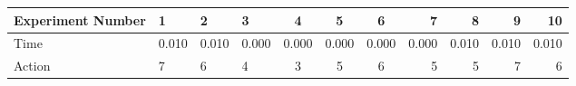 \documentclass[8pt]{article}
\begin{document}
\begin{landscape}
\begin{tabular}{ | l | l | l | l | c | c | c | r | r | r | r | }
 \hline 
Experiment Number & 1 & 2 & 3 & 4 & 5 & 6 & 7 & 8 & 9 & 10\\ \hline
Time & 0.010 & 0.010 & 0.000 & 0.000 & 0.000 & 0.000 & 0.000 & 0.010 & 0.010 & 0.010\\ \hline
Action & 7 & 6 & 4 & 3 & 5 & 6 & 5 & 5 & 7 & 6\\ \hline\end{tabular}
\end{landscape}
\end{document}
